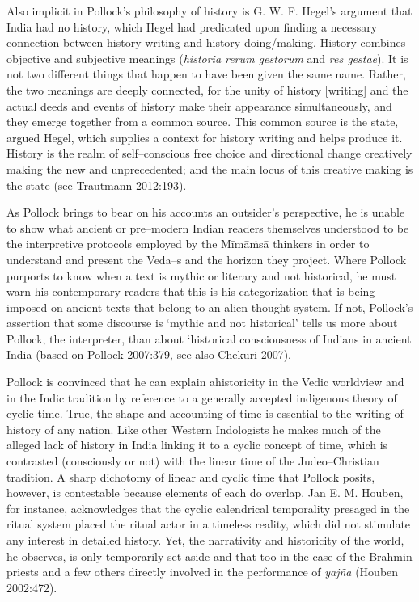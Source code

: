 Also implicit in Pollock’s philosophy of history is G. W. F. Hegel’s argument that India had no history, which Hegel had predicated upon finding a necessary connection between history writing and history doing/making. History combines objective and subjective meanings (\textit{historia rerum gestorum} and \textit{res gestae}). It is not two different things that happen to have been given the same name. Rather, the two meanings are deeply connected, for the unity of history [writing] and the actual deeds and events of history make their appearance simultaneously, and they emerge together from a common source. This common source is the state, argued Hegel, which supplies a context for history writing and helps produce it. History is the realm of self–conscious free choice and directional change creatively making the new and unprecedented; and the main locus of this creative making is the state (see Trautmann 2012:193).

As Pollock brings to bear on his accounts an outsider’s perspective, he is unable to show what ancient or pre–modern Indian readers themselves understood to be the interpretive protocols employed by the Mīmāṁsā thinkers in order to understand and present the Veda–s and the horizon they project. Where Pollock purports to know when a text is mythic or literary and not historical, he must warn his contemporary readers that this is his categorization that is being imposed on ancient texts that belong to an alien thought system. If not, Pollock’s assertion that some discourse is ‘mythic and not historical’ tells us more about Pollock, the interpreter, than about ‘historical consciousness of Indians in ancient India (based on Pollock 2007:379, see also Chekuri 2007).

Pollock is convinced that he can explain ahistoricity in the Vedic worldview and in the Indic tradition by reference to a generally accepted indigenous theory of cyclic time. True, the shape and accounting of time is essential to the writing of history of any nation. Like other Western Indologists he makes much of the alleged lack of history in India linking it to a cyclic concept of time, which is contrasted (consciously or not) with the linear time of the Judeo–Christian tradition. A sharp dichotomy of linear and cyclic time that Pollock posits, however, is contestable because elements of each do overlap. Jan E. M. Houben, for instance, acknowledges that the cyclic calendrical temporality presaged in the ritual system placed the ritual actor in a timeless reality, which did not stimulate any interest in detailed history. Yet, the narrativity and historicity of the world, he observes, is only temporarily set aside and that too in the case of the Brahmin priests and a few others directly involved in the performance of \textit{yajña} (Houben 2002:472).

